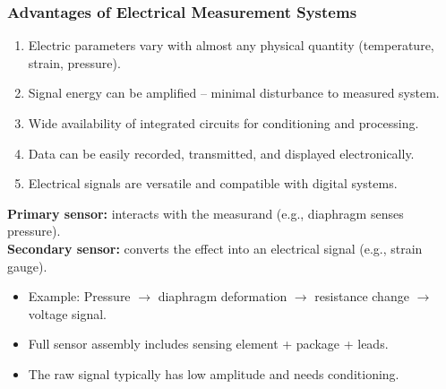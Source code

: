 \begin{frame}
	\frametitle{Advantages of Electrical Measurement Systems}
	\small
	\begin{enumerate}
		\item Electric parameters vary with almost any physical quantity (temperature, strain, pressure).
		\item Signal energy can be amplified  -- minimal disturbance to measured system.
		\item Wide availability of integrated circuits for conditioning and processing.
		\item Data can be easily recorded, transmitted, and displayed electronically.
		\item Electrical signals are versatile and compatible with digital systems.
	\end{enumerate}
	\textbf{Primary sensor:} interacts with the measurand (e.g., diaphragm senses pressure).  \\ 
	\textbf{Secondary sensor:} converts the effect into an electrical signal (e.g., strain gauge).
	\begin{itemize}
		\item Example: Pressure $\rightarrow$ diaphragm deformation $\rightarrow$ resistance change $\rightarrow$ voltage signal.
		\item Full sensor assembly includes sensing element + package + leads.
		\item The raw signal typically has low amplitude and needs conditioning.
	\end{itemize}
\end{frame}
